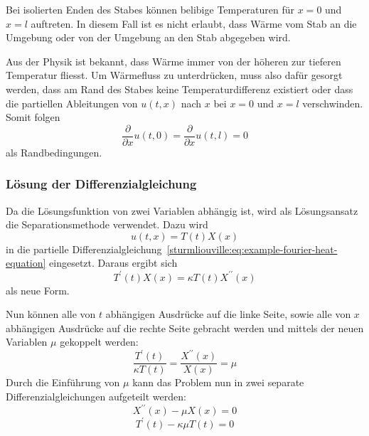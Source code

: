 Bei isolierten Enden des Stabes können belibige Temperaturen für $x = 0$ und
$x = l$ auftreten. In diesem Fall ist es nicht erlaubt, dass Wärme vom Stab
an die Umgebung oder von der Umgebung an den Stab abgegeben wird.

Aus der Physik ist bekannt, dass Wärme immer von der höheren zur tieferen
Temperatur fliesst. Um Wärmefluss zu unterdrücken, muss also dafür gesorgt
werden, dass am Rand des Stabes keine Temperaturdifferenz existiert oder 
dass die partiellen Ableitungen von $u(t,x)$ nach $x$ bei $x = 0$ und $x = l$
verschwinden.
Somit folgen
\begin{equation}
    \label{sturmliouville:eq:example-fourier-boundary-condition-ends-isolated}
    \frac{\partial}{\partial x} u(t, 0)
    =
    \frac{\partial}{\partial x} u(t, l)
    =
    0
\end{equation}
als Randbedingungen.

%
%

\subsubsection{Lösung der Differenzialgleichung}

Da die Lösungsfunktion von zwei Variablen abhängig ist, wird als Lösungsansatz
die Separationsmethode verwendet.
Dazu wird 
\[
    u(t,x)
    =
    T(t)X(x)
\]
in die partielle 
Differenzialgleichung~\eqref{sturmliouville:eq:example-fourier-heat-equation}
eingesetzt.
Daraus ergibt sich 
\[
    T^{\prime}(t)X(x)
    =
    \kappa T(t)X^{\prime \prime}(x)
\]
als neue Form.

Nun können alle von $t$ abhängigen Ausdrücke auf die linke Seite, sowie alle
von $x$ abhängigen Ausdrücke auf die rechte Seite gebracht werden und mittels
der neuen Variablen $\mu$ gekoppelt werden:
\[
    \frac{T^{\prime}(t)}{\kappa T(t)}
    =
    \frac{X^{\prime \prime}(x)}{X(x)}
    =
    \mu
\]
Durch die Einführung von $\mu$ kann das Problem nun in zwei separate
Differenzialgleichungen aufgeteilt werden:
\begin{equation}
    \label{sturmliouville:eq:example-fourier-separated-x}
    X^{\prime \prime}(x) - \mu X(x)
    =
    0
\end{equation}
\begin{equation}
    \label{sturmliouville:eq:example-fourier-separated-t}
    T^{\prime}(t) - \kappa \mu T(t)
    =
    0
\end{equation}

%
%

